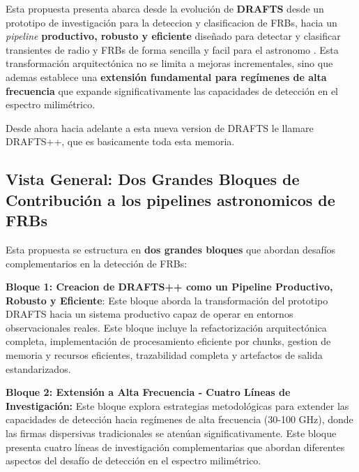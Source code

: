 \setcounter{secnumdepth}{4}
\setcounter{tocdepth}{4}
\makeatletter
\renewcommand\paragraph{\@startsection{paragraph}{4}{\z@}%
  {1.5ex \@plus .5ex \@minus .2ex}%
  {0.8ex \@plus .2ex}%
  {\normalfont\normalsize\bfseries}}  %
\makeatother



Esta propuesta presenta abarca desde la evolución de \textbf{DRAFTS} \cite{zhang2024drafts} desde un prototipo de investigación para la deteccion y clasificacion de FRBs, hacia un \textit{pipeline} 
\textbf{productivo, robusto y eficiente} diseñado para detectar y clasificar transientes de radio y FRBs de forma sencilla y facil para el astronomo . Esta transformación arquitectónica no se limita a 
mejoras incrementales, sino que ademas establece una \textbf{extensión fundamental para regímenes de alta frecuencia} que expande significativamente las capacidades de 
detección en el espectro milimétrico.

Desde ahora hacia adelante a esta nueva version de DRAFTS le llamare DRAFTS++, que es basicamente toda esta memoria.

\subsection{Vista General: Dos Grandes Bloques de Contribución a los pipelines astronomicos de FRBs}

Esta propuesta se estructura en \textbf{dos grandes bloques} que abordan desafíos complementarios en la detección de FRBs:

\textbf{Bloque 1: Creacion de DRAFTS++ como un Pipeline Productivo, Robusto y Eficiente}: Este bloque aborda la transformación del prototipo DRAFTS hacia un sistema productivo capaz de operar en entornos observacionales reales.
 Este bloque incluye la refactorización arquitectónica completa, implementación de procesamiento eficiente por chunks, gestion de memoria y recursos eficientes, trazabilidad completa y artefactos de salida estandarizados.

\textbf{Bloque 2: Extensión a Alta Frecuencia - Cuatro Líneas de Investigación:} Este bloque explora estrategias metodológicas para extender las capacidades de detección hacia regímenes de alta frecuencia (30-100 GHz), 
donde las firmas dispersivas tradicionales se atenúan significativamente. Este bloque presenta cuatro líneas de investigación complementarias que abordan diferentes aspectos del desafío de detección en el espectro milimétrico.

